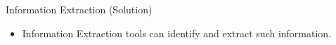 \documentclass[xcolor=dvipsnames]{beamer}
\begin{document}
\begin{frame}{Information Extraction (Solution)}  
\begin{itemize}
	\item Information Extraction tools can identify and extract such information.
	\medskip
\end{itemize}
\end{frame}
\end{document}
